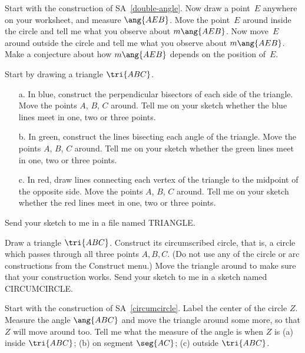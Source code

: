 \begin{SA}
Start with the construction of SA~\ref{double-angle}.
Now draw a point~$E$ anywhere on your worksheet, and measure $\ang{AEB}$.
Move the point~$E$ around inside the circle and tell me what you observe about
$m\ang{AEB}$.  Now move~$E$ around outside the circle and tell me what you 
observe about $m\ang{AEB}$.  Make a conjecture about how $m\ang{AEB}$
depends on the position of~$E$.
\end{SA}

\begin{SA} \label{triangle-centers}
Start by drawing a triangle $\tri{ABC}$.
\begin{itemize}
  \item[a.] In blue, construct the perpendicular bisectors of each
side of the triangle.  Move the points $A$, $B$, $C$ around.
Tell me on your sketch whether the blue lines meet in one, two or three points.
  \item[b.] In green, construct the lines bisecting each angle of the
triangle.  Move the points $A$, $B$, $C$ around.
Tell me on your sketch whether the green lines meet in one, two or three points.
  \item[c.] In red, draw lines connecting each vertex of the triangle to the midpoint of the opposite side.  Move the points $A$, $B$, $C$ around.
Tell me on your sketch whether the red lines meet in one, two or three points.
\end{itemize}
Send your sketch to me in a file named TRIANGLE.
\end{SA}

\begin{SA} \label{circumcircle}
Draw a triangle $\tri{ABC}$.  Construct its circumscribed circle,
that is, a circle which passes through
all three points $A,B,C$.  (Do not use any of the circle or
arc constructions from the Construct menu.)
Move the triangle around to make sure that your
construction works.  Send your sketch to me in a sketch named
CIRCUMCIRCLE.
\end{SA}

\begin{SA}
Start with the construction of SA~\ref{circumcircle}.
Label the center of the circle $Z$.  Measure the angle
$\ang{ABC}$ and move the triangle around some more, so that $Z$ will
move around too.  Tell me what the measure of the angle is when $Z$ is
(a) inside $\tri{ABC}$; (b) on segment $\seg{AC}$; (c) outside
$\tri{ABC}$.
\end{SA}

